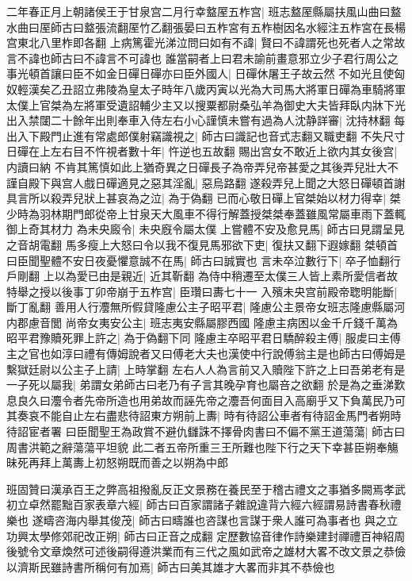 二年春正月上朝諸侯王于甘泉宫二月行幸盩厔五柞宫|{
	班志盩厔縣屬扶風山曲曰盩水曲曰厔師古曰盩張流翻厔竹乙翻張晏曰五柞宮有五柞樹因名水經注五柞宮在長楊宫東北八里柞即各翻}
上病篤霍光涕泣問曰如有不諱|{
	賢曰不諱謂死也死者人之常故言不諱也師古曰不諱言不可諱也}
誰當嗣者上曰君未諭前畫意邪立少子君行周公之事光頓首讓曰臣不如金日磾日磾亦曰臣外國人|{
	日磾休屠王子故云然}
不如光且使匈奴輕漢矣乙丑詔立弗陵為皇太子時年八歲丙寅以光為大司馬大將軍日磾為車騎將軍太僕上官桀為左將軍受遺詔輔少主又以搜粟都尉桑弘羊為御史大夫皆拜臥内牀下光出入禁闥二十餘年出則奉車入侍左右小心謹慎未嘗有過為人沈静詳審|{
	沈持林翻}
每出入下殿門止進有常處郎僕射竊識視之|{
	師古曰識記也音式志翻又職吏翻}
不失尺寸日磾在上左右目不忤視者數十年|{
	忤逆也五故翻}
賜出宫女不敢近上欲内其女後宫|{
	内讀曰納}
不肯其篤慎如此上猶奇異之日磾長子為帝弄兒帝甚愛之其後弄兒壯大不謹自殿下與宫人戲日磾適見之惡其淫亂|{
	惡烏路翻}
遂殺弄兒上聞之大怒日磾頓首謝具言所以殺弄兒狀上甚哀為之泣|{
	為于偽翻}
已而心敬日磾上官桀始以材力得幸|{
	桀少時為羽林期門郎從帝上甘泉天大風車不得行解蓋授桀桀奉蓋雖風常屬車雨下蓋輒御上奇其材力}
為未央廄令|{
	未央廐令屬太僕}
上嘗體不安及愈見馬|{
	師古曰見謂呈見之音胡電翻}
馬多瘦上大怒曰令以我不復見馬邪欲下吏|{
	復扶又翻下遐嫁翻}
桀頓首曰臣聞聖體不安日夜憂懼意誠不在馬|{
	師古曰誠實也}
言未卒泣數行下|{
	卒子恤翻行戶剛翻}
上以為愛已由是親近|{
	近其靳翻}
為侍中稍遷至太僕三人皆上素所愛信者故特舉之授以後事丁卯帝崩于五柞宫|{
	臣瓚曰夀七十一}
入殯未央宫前殿帝聦明能斷|{
	斷丁亂翻}
善用人行灋無所假貸隆慮公主子昭平君|{
	隆慮公主景帝女班志隆慮縣屬河内郡慮音閭}
尚帝女夷安公主|{
	班志夷安縣屬膠西國}
隆慮主病困以金千斤錢千萬為昭平君豫贖死罪上許之|{
	為于偽翻下同}
隆慮主卒昭平君日驕醉殺主傅|{
	服䖍曰主傅主之官也如淳曰禮有傳姆說者又曰傅老大夫也漢使中行說傅翁主是也師古曰傅姆是}
繫獄廷尉以公主子上請|{
	上時掌翻}
左右人人為言前又入贖陛下許之上曰吾弟老有是一子死以屬我|{
	弟謂女弟師古曰老乃有子言其晚孕育也屬咅之欲翻}
於是為之垂涕歎息良久曰灋令者先帝所造也用弟故而誣先帝之灋吾何面目入高廟乎又下負萬民乃可其奏哀不能自止左右盡悲待詔東方朔前上夀|{
	時有待詔公車者有待詔金馬門者朔時待詔宦者署}
曰臣聞聖王為政賞不避仇讎誅不擇骨肉書曰不偏不黨王道蕩蕩|{
	師古曰周書洪範之辭蕩蕩平坦貌}
此二者五帝所重三王所難也陛下行之天下幸甚臣朔奉觴昧死再拜上萬夀上初怒朔既而善之以朔為中郎

班固贊曰漢承百王之弊高祖撥亂反正文景務在養民至于稽古禮文之事猶多闕焉孝武初立卓然罷黜百家表章六經|{
	師古曰百家謂諸子雜說違背六經六經謂易詩書春秋禮樂也}
遂疇咨海内舉其俊茂|{
	師古曰疇誰也咨謀也言謀于衆人誰可為事者也}
與之立功興太學修郊祀改正朔|{
	師古曰正音之成翻}
定歷數協音律作詩樂建封禪禮百神紹周後號令文章煥然可述後嗣得遵洪業而有三代之風如武帝之雄材大畧不改文景之恭儉以濟斯民雖詩書所稱何有加焉|{
	師古曰美其雄才大畧而非其不恭儉也}


